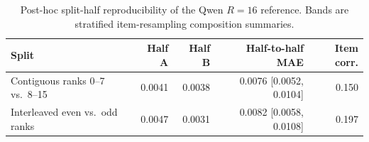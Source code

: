 \begin{table}[t]
\centering
\begin{tabular}{lrrrr}
\toprule
Split & Half A & Half B & Half-to-half MAE & Item corr. \\
\midrule
Contiguous ranks 0--7 vs.\ 8--15 & 0.0041 & 0.0038 & 0.0076 [0.0052, 0.0104] & 0.150 \\
Interleaved even vs.\ odd ranks & 0.0047 & 0.0031 & 0.0082 [0.0058, 0.0108] & 0.197 \\
\bottomrule
\end{tabular}
\caption{Post-hoc split-half reproducibility of the Qwen \(R=16\) reference.
Bands are stratified item-resampling composition
summaries.\maintextreproductionnote}
\end{table}
